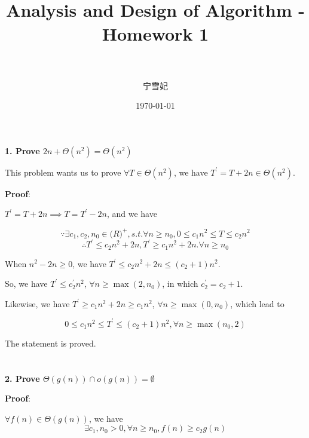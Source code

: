 \documentclass[paper=a4, fontsize=11pt]{scrartcl} %
\title{	
\normalfont \normalsize 
\horrule{0.5pt} \\[0.4cm] %
\huge Analysis and Design of Algorithm - Homework 1\\ %
\horrule{2pt} \\[0.5cm] %
}
\author{宁雪妃} %
\date{\normalsize\today} %
\numberwithin{equation}{section} %
\numberwithin{figure}{section} %
\numberwithin{table}{section} %
\begin{document}
\maketitle %



\section{}
\textbf{1. Prove $2n + \Theta(n^2) = \Theta(n^2)$}

This problem wants us to prove $\forall T \in \Theta(n^2)$,  we have $T^{'} = T + 2n \in \Theta(n^2)$.

\textbf{Proof}:

$T^{'} = T + 2n \implies T = T^{'} - 2n$, and we have

\[
\because \exists c_1, c_2, n_0 \in {\mathbb(R)}^+, s.t. \forall n \geq n_0, 0 \leq c_1n^2 \leq T \leq c_2n^2
\]
\[
\therefore T^{'} \leq c_2n^2 + 2n, T^{'} \geq c_1n^2 + 2n. \forall n \geq n_0
\]

When $n^2 - 2n \geq 0$, we have $T^{'} \leq c_2n^2 + 2n \leq (c_2 + 1)n^2$.

So, we have $T^{'} \leq c_2^{'} n^2$, $\forall n \geq \max(2, n_0)$, in which $c_2^{'} = c_2 + 1$.

Likewise, we have $T^{'} \geq c_1n^2 + 2n \geq c_1n^2$, $\forall n \geq \max(0, n_0)$, which lead to

\[
0 \leq c_1n^2 \leq T^{'} \leq (c_2 + 1)n^2, \forall n \geq \max(n_0, 2)
\]

The statement is proved.

\section{}
\textbf{2. Prove $\Theta(g(n)) \cap o(g(n)) = \emptyset$}

\textbf{Proof}:

$\forall f(n) \in \Theta(g(n))$, we have
\begin{equation}
  \exists c_1, n_0 > 0, \forall n \geq n_0, f(n) \geq c_2g(n)
  \label{eq:2_1}
\end{equation}
\end{document}
